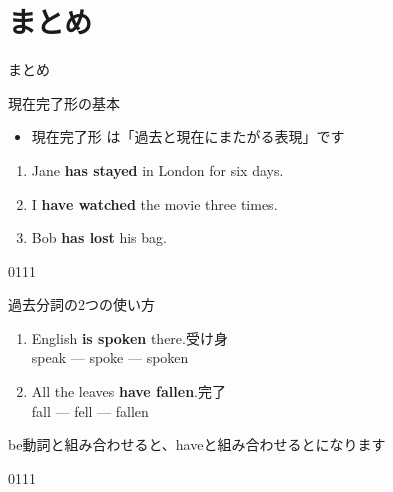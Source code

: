\documentclass[aspectratio=169,xcolor={dvipsnames,table}]{beamer}
\newcommand{\myaudio}[1]{\href{#1}{\faVolumeUp}}
\begin{document}
\section{まとめ}
\begin{frame}[plain]{まとめ}


 \begin{block}{現在完了形の基本}
\small
\begin{itemize}[square]
 \item  現在完了形\,\,は「過去と現在にまたがる表現」です
\end{itemize}
      \end{block}

\begin{enumerate}
 \item Jane \textcolor{NavyBlue}{\bfseries has stayed} in London for six days.
 \item I \textcolor{NavyBlue}{\bfseries have watched} the movie three times.
 \item Bob \textcolor{NavyBlue}{\bfseries has lost} his bag.
\end{enumerate}

\mbox{}\hfill{\tiny 0111}\,{\scriptsize \myaudio{./audio/011_have_pp_intro_06.mp3}}
\end{frame}
\begin{frame}[plain]{過去分詞の2つの使い方}
\large 

\begin{enumerate}
 \item English {\bfseries is spoken} there.\hfill{}受け身\\
\hfill{}{\scriptsize speak  --- spoke  --- spoken }
 \item All the leaves {\bfseries have fallen}.\hfill{}完了\\
\hfill{}{\scriptsize fall  --- fell  --- fallen }
\end{enumerate}
\vspace{20pt}
be動詞と組み合わせると、haveと組み合わせるとになります

\vspace{40pt}

\mbox{}\hfill{\tiny 0111}\,{\scriptsize \myaudio{./audio/011_have_pp_intro_07.mp3}}

\end{frame}
\end{document}
